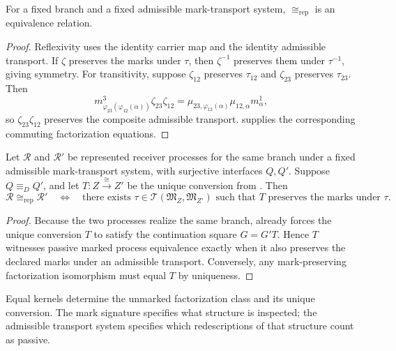 \begin{proposition}\label{prop:marked-process-equivalence-v14}
For a fixed branch and a fixed admissible mark-transport system, $\cong_{\mathrm{rep}}$ is an equivalence relation.
\end{proposition}

\begin{proof}
Reflexivity uses the identity carrier map and the identity admissible transport. If $\zeta$ preserves the marks under $\tau$, then $\zeta^{-1}$ preserves them under $\tau^{-1}$, giving symmetry. For transitivity, suppose $\zeta_{12}$ preserves $\tau_{12}$ and $\zeta_{23}$ preserves $\tau_{23}$. Then
\[
m^3_{\varphi_{23}(\varphi_{12}(\alpha))}\zeta_{23}\zeta_{12}
=
\mu_{23,\varphi_{12}(\alpha)}\mu_{12,\alpha}m^1_\alpha,
\]
so $\zeta_{23}\zeta_{12}$ preserves the composite admissible transport.  supplies the corresponding commuting factorization equations.
\end{proof}

\begin{theorem}\label{thm:marked-lift-v14}
Let $\mathcal R$ and $\mathcal R'$ be represented receiver processes for the same branch under a fixed admissible mark-transport system, with surjective interfaces $Q,Q'$. Suppose $Q\equiv_DQ'$, and let $T:Z\xrightarrow{\cong}Z'$ be the unique conversion from . Then
\[
\boxed{
\mathcal R\cong_{\mathrm{rep}}\mathcal R'
\quad\Longleftrightarrow\quad
\text{there exists }\tau\in\mathcal T(\mathfrak M_Z,\mathfrak M_{Z'})
\text{ such that }T\text{ preserves the marks under }\tau.
}
\]
\end{theorem}

\begin{proof}
Because the two processes realize the same branch,  already forces the unique conversion $T$ to satisfy the continuation square $G=G'T$. Hence $T$ witnesses passive marked process equivalence exactly when it also preserves the declared marks under an admissible transport. Conversely, any mark-preserving factorization isomorphism must equal $T$ by uniqueness.
\end{proof}

Equal kernels determine the unmarked factorization class and its unique conversion. The mark signature specifies what structure is inspected; the admissible transport system specifies which redescriptions of that structure count as passive.


